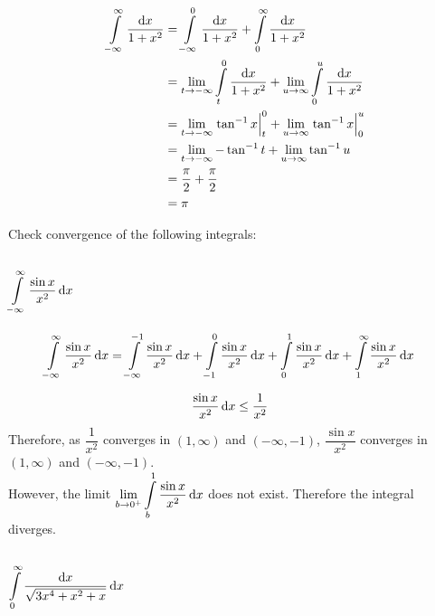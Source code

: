 \documentclass[fleqn, a4paper, draft]{amsart}
\makeatletter
\def\section{\@startsection{section}{1}%
	\z@{.7\linespacing\@plus\linespacing}{.5\linespacing}%
	{\normalfont\scshape}}%
\makeatother
\begin{document}
\begin{align*}
	\int\limits_{-\infty}^{\infty} \dfrac{\dif x}{1 + x^2} &= \int\limits_{-\infty}^{0} \dfrac{\dif x}{1 + x^2} + \int\limits_{0}^{\infty} \dfrac{\dif x}{1 + x^2}\\
	&= \lim\limits_{t \to -\infty} \int\limits_{t}^{0} \dfrac{\dif x}{1 + x^2} + \lim\limits_{u \to \infty} \int\limits_{0}^{u} \dfrac{\dif x}{1 + x^2}\\
	&= \lim\limits_{t \to -\infty} \left. \tan^{-1} x \right\rvert_{t}^{0} + \lim\limits_{u \to \infty} \left. \tan^{-1} x \right\rvert_{0}^{u}\\
	&= \lim\limits_{t \to -\infty} -\tan^{-1} t + \lim\limits_{u \to \infty} \tan^{-1} u\\
	&= \dfrac{\pi}{2} + \dfrac{\pi}{2}\\
	&= \pi
\end{align*}

\section{Check convergence of the following integrals:}

\subsection{$\displaystyle \int\limits_{-\infty}^{\infty} \dfrac{\sin x}{x^2} \dif x$}

\begin{align*}
	\int\limits_{-\infty}^{\infty} \dfrac{\sin x}{x^2} \dif x &= \int\limits_{-\infty}^{-1} \dfrac{\sin x}{x^2} \dif x + \int\limits_{-1}^{0} \dfrac{\sin x}{x^2} \dif x + \int\limits_{0}^{1} \dfrac{\sin x}{x^2} \dif x + \int\limits_{1}^{\infty} \dfrac{\sin x}{x^2} \dif x
\end{align*}

\begin{align*}
	\dfrac{\sin x}{x^2} \dif x &\leq \dfrac{1}{x^2}
\end{align*}
Therefore, as $\dfrac{1}{x^2}$ converges in $(1, \infty)$ and $(-\infty, -1)$, $\dfrac{\sin x}{x^2}$ converges in $(1, \infty)$ and $(-\infty, -1)$.\\
However, the limit $\displaystyle \lim\limits_{b \to 0^+} \int\limits_{b}^{1} \dfrac{\sin x}{x^2} \dif x$ does not exist. Therefore the integral diverges.

\subsection{$\displaystyle \int\limits_{0}^{\infty} \dfrac{\dif x}{\sqrt{3 x^4 + x^2 + x}} \dif x$}
\end{document}
